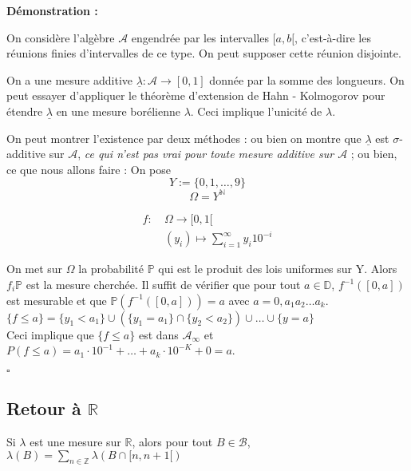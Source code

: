 \documentclass[10pt,a4paper,notitlepage ]{report}
\newcommand{\N}{\mathbb N}
\newcommand{\R}{\mathbb R}
\newcommand{\A}{\mathcal A}
\newcommand{\1}{\mathds 1}
\newcommand{\prob}{\mathbb P}
\newcounter{th}
\newenvironment{demo}[1][]{

	\textbf{Démonstration #1 :}
}{\begin{flushright}
	$\square$
\end{flushright}
}
\begin{document}
\begin{demo}

On considère l'algèbre $\A$ engendrée par les intervalles $[a,b[$, c'est-à-dire les réunions finies d'intervalles de ce type. On peut supposer cette réunion disjointe.

On a une mesure additive $\underline\lambda : \A \rightarrow [0,1] $ donnée par la somme des longueurs. On peut essayer d'appliquer le théorème d'extension de Hahn - Kolmogorov pour étendre $\underline\lambda$ en une mesure borélienne $\lambda$. Ceci implique l'unicité de $\lambda$.

On peut montrer l'existence par deux méthodes : ou bien on montre que $\underline{\lambda} $ est $\sigma$-additive sur $\A$, \emph{ce qui n'est pas vrai pour toute mesure additive sur $\A$} ; ou bien, ce que nous allons faire : On pose 
\[Y := \lbrace 0,1, \ldots , 9 \rbrace \]
\[ \Omega = Y ^\N \]


\begin{align*}
f : \ &\Omega \rightarrow [0,1[ \\
&(y_i) \mapsto \sum_{i=1}^\infty y_i 10^{-i} 
\end{align*}


On met sur $\Omega$ la probabilité $\prob$ qui est le produit des lois uniformes sur Y. Alors $f_i \prob $ est la mesure cherchée.
Il suffit de vérifier que pour tout $a \in \mathbb{D} $, $f^{-1} \left( [0,a]  \right) $ est mesurable et que 
$\prob \left( f^{-1} \left( [0,a]  \right) \right) = a $ avec $ a = 0, a_1 a_2 \ldots a_k $. \\

$\lbrace f \leq a \rbrace = \lbrace y_1 < a_1 \rbrace \cup (\lbrace y_1 = a_1 \rbrace \cap \lbrace y_2 < a_2 \rbrace) \cup \dots \cup \lbrace y = a \rbrace $ \\

Ceci implique que $\lbrace f \leq a \rbrace$ est dans $ \A_{\infty} $ et $P (f \leq a ) = a_1 \cdot 10^{-1} + \dots + a_k \cdot 10 ^ {-K} + 0 = a $.

\end{demo}

\subsection{Retour à $\R$}

Si $\lambda $ est une mesure sur $\R$, alors pour tout $B \in \mathcal{B}$, $\lambda (B) = \sum \limits_{n \in \mathbb{Z} } \lambda (B \cap [n, n+1[ ) $ \\
\end{document}
